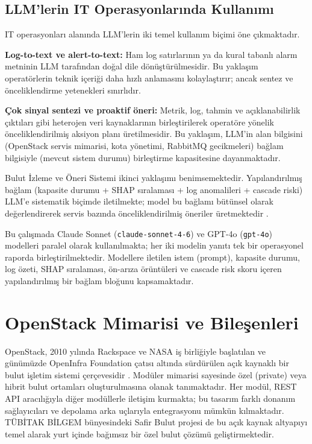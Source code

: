 \subsection{LLM'lerin IT Operasyonlarında Kullanımı}

IT operasyonları alanında LLM'lerin iki temel kullanım biçimi öne çıkmaktadır.

\textbf{Log-to-text ve alert-to-text:} Ham log satırlarının ya da kural tabanlı alarm metninin LLM tarafından doğal dile dönüştürülmesidir.
Bu yaklaşım operatörlerin teknik içeriği daha hızlı anlamasını kolaylaştırır; ancak sentez ve önceliklendirme yetenekleri sınırlıdır.

\textbf{Çok sinyal sentezi ve proaktif öneri:} Metrik, log, tahmin ve açıklanabilirlik çıktıları gibi heterojen veri kaynaklarının birleştirilerek operatöre yönelik önceliklendirilmiş aksiyon planı üretilmesidir.
Bu yaklaşım, LLM'in alan bilgisini (OpenStack servis mimarisi, kota yönetimi, RabbitMQ gecikmeleri) bağlam bilgisiyle (mevcut sistem durumu) birleştirme kapasitesine dayanmaktadır.

Bulut İzleme ve Öneri Sistemi ikinci yaklaşımı benimsemektedir.
Yapılandırılmış bağlam (kapasite durumu + SHAP sıralaması + log anomalileri + cascade riski) LLM'e sistematik biçimde iletilmekte; model bu bağlamı bütünsel olarak değerlendirerek servis bazında önceliklendirilmiş öneriler üretmektedir \autocite{brown2020, openai2023, anthropic2024}.

Bu çalışmada Claude Sonnet (\texttt{claude-sonnet-4-6}) ve GPT-4o (\texttt{gpt-4o}) modelleri paralel olarak kullanılmakta; her iki modelin yanıtı tek bir operasyonel raporda birleştirilmektedir.
Modellere iletilen istem (prompt), kapasite durumu, log özeti, SHAP sıralaması, ön-arıza örüntüleri ve cascade risk skoru içeren yapılandırılmış bir bağlam bloğunu kapsamaktadır.


\section{OpenStack Mimarisi ve Bileşenleri}
\label{sec:openstack}

OpenStack, 2010 yılında Rackspace ve NASA iş birliğiyle başlatılan ve günümüzde OpenInfra Foundation çatısı altında sürdürülen açık kaynaklı bir bulut işletim sistemi çerçevesidir \autocite{openstack2024}.
Modüler mimarisi sayesinde özel (private) veya hibrit bulut ortamları oluşturulmasına olanak tanımaktadır.
Her modül, REST API aracılığıyla diğer modüllerle iletişim kurmakta; bu tasarım farklı donanım sağlayıcıları ve depolama arka uçlarıyla entegrasyonu mümkün kılmaktadır.
TÜBİTAK BİLGEM bünyesindeki Safir Bulut projesi de bu açık kaynak altyapıyı temel alarak yurt içinde bağımsız bir özel bulut çözümü geliştirmektedir.

